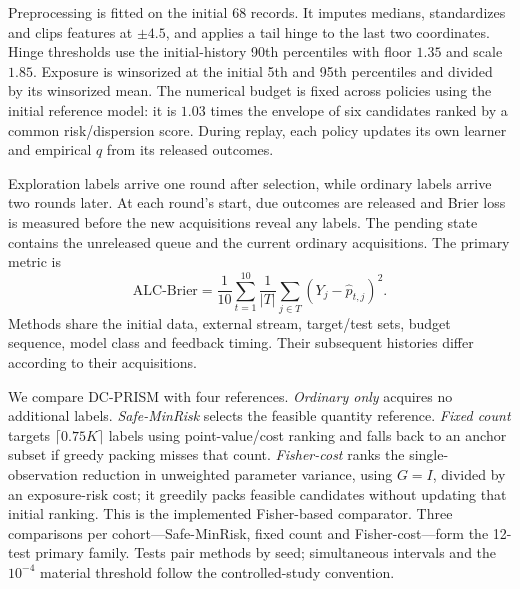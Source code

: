 \documentclass[runningheads]{llncs}
\begin{document}
Preprocessing is fitted on the initial 68 records. It imputes medians, standardizes and clips features at $\pm4.5$, and applies a tail hinge to the last two coordinates. Hinge thresholds use the initial-history 90th percentiles with floor $1.35$ and scale $1.85$. Exposure is winsorized at the initial 5th and 95th percentiles and divided by its winsorized mean. The numerical budget is fixed across policies using the initial reference model: it is $1.03$ times the envelope of six candidates ranked by a common risk/dispersion score. During replay, each policy updates its own learner and empirical $q$ from its released outcomes.

Exploration labels arrive one round after selection, while ordinary labels arrive two rounds later. At each round's start, due outcomes are released and Brier loss is measured before the new acquisitions reveal any labels. The pending state contains the unreleased queue and the current ordinary acquisitions. The primary metric is
\begin{equation}
 \mathrm{ALC\text{-}Brier}=\frac1{10}\sum_{t=1}^{10}
 \frac1{|T|}\sum_{j\in T}(Y_j-\widehat p_{t,j})^2.
\end{equation}
Methods share the initial data, external stream, target/test sets, budget sequence, model class and feedback timing. Their subsequent histories differ according to their acquisitions.

We compare DC-PRISM with four references. \emph{Ordinary only} acquires no additional labels. \emph{Safe-MinRisk} selects the feasible quantity reference. \emph{Fixed count} targets $\lceil0.75K\rceil$ labels using point-value/cost ranking and falls back to an anchor subset if greedy packing misses that count. \emph{Fisher-cost} ranks the single-observation reduction in unweighted parameter variance, using $G=I$, divided by an exposure-risk cost; it greedily packs feasible candidates without updating that initial ranking. This is the implemented Fisher-based comparator. Three comparisons per cohort---Safe-MinRisk, fixed count and Fisher-cost---form the 12-test primary family. Tests pair methods by seed; simultaneous intervals and the $10^{-4}$ material threshold follow the controlled-study convention.
\end{document}
